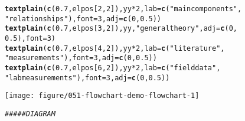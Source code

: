\documentclass{article}\usepackage[]{graphicx}\usepackage[]{xcolor}
\makeatletter
\def\maxwidth{ %
  \ifdim\Gin@nat@width>\linewidth
    \linewidth
  \else
    \Gin@nat@width
  \fi
}
\newcommand{\hlnum}[1]{\textcolor[rgb]{0.686,0.059,0.569}{#1}}%
\newcommand{\hlsng}[1]{\textcolor[rgb]{0.192,0.494,0.8}{#1}}%
\newcommand{\hlcom}[1]{\textcolor[rgb]{0.678,0.584,0.686}{\textit{#1}}}%
\newcommand{\hlopt}[1]{\textcolor[rgb]{0,0,0}{#1}}%
\newcommand{\hldef}[1]{\textcolor[rgb]{0.345,0.345,0.345}{#1}}%
\newcommand{\hlkwc}[1]{\textcolor[rgb]{0.333,0.667,0.333}{#1}}%
\newcommand{\hlkwd}[1]{\textcolor[rgb]{0.737,0.353,0.396}{\textbf{#1}}}%
\newenvironment{kframe}{%
 \def\at@end@of@kframe{}%
 \ifinner\ifhmode%
  \def\at@end@of@kframe{\end{minipage}}%
  \begin{minipage}{\columnwidth}%
 \fi\fi%
 \def\FrameCommand##1{\hskip\@totalleftmargin \hskip-\fboxsep
 \colorbox{shadecolor}{##1}\hskip-\fboxsep
     \hskip-\linewidth \hskip-\@totalleftmargin \hskip\columnwidth}%
 \MakeFramed {\advance\hsize-\width
   \@totalleftmargin\z@ \linewidth\hsize
   \@setminipage}}%
 {\par\unskip\endMakeFramed%
 \at@end@of@kframe}
\newenvironment{knitrout}{}{} %
\makeatother
\begin{document}
\begin{knitrout}
\begin{kframe}
\begin{alltt}
\hlkwd{textplain}\hldef{(}\hlkwd{c}\hldef{(}\hlnum{0.7}\hldef{, elpos[}\hlnum{2}\hldef{,} \hlnum{2}\hldef{]), yy} \hlopt{*} \hlnum{2}\hldef{,} \hlkwc{lab} \hldef{=} \hlkwd{c}\hldef{(}\hlsng{"main components"}\hldef{,}
    \hlsng{"relationships"}\hldef{),} \hlkwc{font} \hldef{=} \hlnum{3}\hldef{,} \hlkwc{adj} \hldef{=} \hlkwd{c}\hldef{(}\hlnum{0}\hldef{,} \hlnum{0.5}\hldef{))}
\hlkwd{textplain}\hldef{(}\hlkwd{c}\hldef{(}\hlnum{0.7}\hldef{, elpos[}\hlnum{3}\hldef{,} \hlnum{2}\hldef{]), yy,} \hlsng{"general theory"}\hldef{,} \hlkwc{adj} \hldef{=} \hlkwd{c}\hldef{(}\hlnum{0}\hldef{,}
    \hlnum{0.5}\hldef{),} \hlkwc{font} \hldef{=} \hlnum{3}\hldef{)}
\hlkwd{textplain}\hldef{(}\hlkwd{c}\hldef{(}\hlnum{0.7}\hldef{, elpos[}\hlnum{4}\hldef{,} \hlnum{2}\hldef{]), yy} \hlopt{*} \hlnum{2}\hldef{,} \hlkwc{lab} \hldef{=} \hlkwd{c}\hldef{(}\hlsng{"literature"}\hldef{,}
    \hlsng{"measurements"}\hldef{),} \hlkwc{font} \hldef{=} \hlnum{3}\hldef{,} \hlkwc{adj} \hldef{=} \hlkwd{c}\hldef{(}\hlnum{0}\hldef{,} \hlnum{0.5}\hldef{))}
\hlkwd{textplain}\hldef{(}\hlkwd{c}\hldef{(}\hlnum{0.7}\hldef{, elpos[}\hlnum{6}\hldef{,} \hlnum{2}\hldef{]), yy} \hlopt{*} \hlnum{2}\hldef{,} \hlkwc{lab} \hldef{=} \hlkwd{c}\hldef{(}\hlsng{"field data"}\hldef{,}
    \hlsng{"lab measurements"}\hldef{),} \hlkwc{font} \hldef{=} \hlnum{3}\hldef{,} \hlkwc{adj} \hldef{=} \hlkwd{c}\hldef{(}\hlnum{0}\hldef{,} \hlnum{0.5}\hldef{))}
\end{alltt}
\end{kframe}
\texttt{[image: figure/051-flowchart-demo-flowchart-1]} 
\begin{kframe}\begin{alltt}
\hlcom{##### DIAGRAM}


\end{alltt}
\end{kframe}
\end{knitrout}
\end{document}
